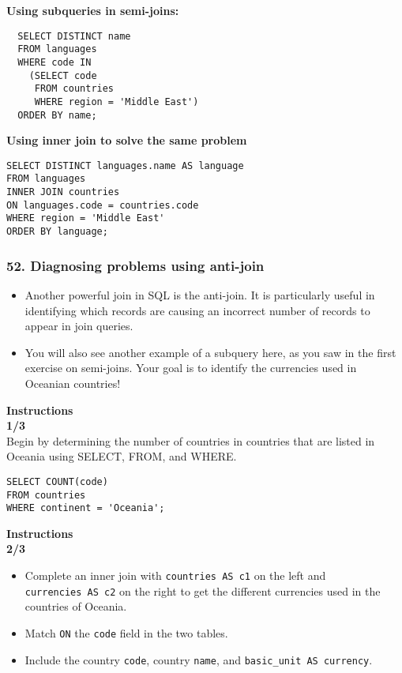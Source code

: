\documentclass[
]{article}
\providecommand{\tightlist}{%
  \setlength{\itemsep}{0pt}\setlength{\parskip}{0pt}}
\begin{document}
\textbf{Using subqueries in semi-joins:}

\begin{verbatim}
  SELECT DISTINCT name
  FROM languages
  WHERE code IN
    (SELECT code
     FROM countries
     WHERE region = 'Middle East')
  ORDER BY name;
\end{verbatim}

\textbf{Using inner join to solve the same problem}

\begin{verbatim}
SELECT DISTINCT languages.name AS language
FROM languages
INNER JOIN countries
ON languages.code = countries.code
WHERE region = 'Middle East'
ORDER BY language;
\end{verbatim}

\hypertarget{diagnosing-problems-using-anti-join}{%
\subsubsection{52. Diagnosing problems using
anti-join}\label{diagnosing-problems-using-anti-join}}

\begin{itemize}
\item
  Another powerful join in SQL is the anti-join. It is particularly
  useful in identifying which records are causing an incorrect number of
  records to appear in join queries.
\item
  You will also see another example of a subquery here, as you saw in
  the first exercise on semi-joins. Your goal is to identify the
  currencies used in Oceanian countries!
\end{itemize}

\textbf{Instructions}\\
\textbf{1/3}\\
Begin by determining the number of countries in countries that are
listed in Oceania using SELECT, FROM, and WHERE.

\begin{verbatim}
SELECT COUNT(code)
FROM countries
WHERE continent = 'Oceania';
\end{verbatim}

\textbf{Instructions}\\
\textbf{2/3}

\begin{itemize}
\tightlist
\item
  Complete an inner join with \texttt{countries\ AS\ c1} on the left and
  \texttt{currencies\ AS\ c2} on the right to get the different
  currencies used in the countries of Oceania.\\
\item
  Match \texttt{ON} the \texttt{code} field in the two tables.\\
\item
  Include the country \texttt{code}, country \texttt{name}, and
  \texttt{basic\_unit\ AS\ currency}.
\end{itemize}
\end{document}
